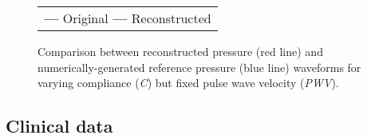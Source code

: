 \begin{figure}[h!]
\begin{center}

\begin{tabular}{m{3.5cm} m{3.5cm} m{3.5cm} m{3.5cm}}
\multicolumn{4}{c}{
\LARGE{\color{blue} \textbf{---}} \normalsize Original
\LARGE{\color{red} \textbf{---}} \normalsize Reconstructed
}
\end{tabular}
\caption[Comparison between reconstructed pressure and numerically-generated reference pressure waveforms for varying compliance (\textit{C}) but fixed pulse wave velocity (\textit{PWV})]{Comparison between reconstructed pressure (red line) and numerically-generated reference pressure (blue line) waveforms for varying compliance (\textit{C}) but fixed pulse wave velocity (\textit{PWV}).}
\end{center}
\end{figure}

\clearpage

\subsection{Clinical data}

